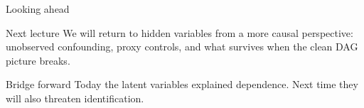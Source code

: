 \documentclass[dvipsnames,aspectratio=169,handout]{beamer}
\begin{document}
\begin{frame}{Looking ahead}
\begin{block}{Next lecture}
We will return to hidden variables from a more causal perspective: unobserved confounding, proxy controls, and what survives when the clean DAG picture breaks.
\end{block}

\begin{alertblock}{Bridge forward}
Today the latent variables explained dependence.
Next time they will also threaten identification.
\end{alertblock}
\end{frame}
\end{document}
